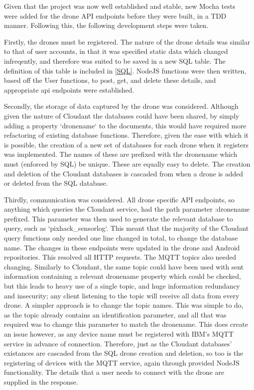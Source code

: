 \documentclass{article}
\begin{document}
Given that the project was now well established and stable, new Mocha tests were added for the drone API endpoints before they were built, in a TDD manner. Following this, the following development steps were taken. 

Firstly, the drones must be registered. The nature of the drone details was similar to that of user accounts, in that it was specified static data which changed infreqently, and therefore was suited to be saved in a new SQL table. The definition of this table is included in \ref{SQL}. NodeJS functions were then written, based off the User functions, to post, get, and delete these details, and appropriate api endpoints were established. 

Secondly, the storage of data captured by the drone was considered. Although given the nature of Cloudant the databases could have been shared, by simply adding a property `dronename` to the documents, this would have required more refactoring of existing database functions. Therefore, given the ease with which it is possible, the creation of a new set of databases for each drone when it registers was implemented. The names of these are prefixed with the dronename which must (enforced by SQL) be unique. These are equally easy to delete. The creation and deletion of the Cloudant databases is cascaded from when a drone is added or deleted from the SQL database. 

Thirdly, communication was considered. All drone specific API endpoints, so anything which queries the Cloudant service, had the path parameter :dronename prefixed. This parameter was then used to generate the relevant database to query, such as `pixhack\_sensorlog`. This meant that the majority of the Cloudant query functions only needed one line changed in total, to change the database name. The changes in these endpoints were updated in the drone and Android repositories. This resolved all HTTP requests. The MQTT topics also needed changing. Similarly to Cloudant, the same topic could have been used with sent information containing a relevant dronename property which could be checked, but this leads to heavy use of a single topic, and huge information redundancy and insecurity; any client listening to the topic will receive all data from every drone. A simpler approach is to change the topic names. This was simple to do, as the topic already contains an identification parameter, and all that was required was to change this parameter to match the dronename. This does create an issue however, as any device name must be registered with IBM's MQTT service in advance of connection. Therefore, just as the Cloudant databases' existances are cascaded from the SQL drone creation and deletion, so too is the registering of devices with the MQTT service, again through provided NodeJS functionality. The details that a user needs to connect with the drone are supplied in the response.
\end{document}
